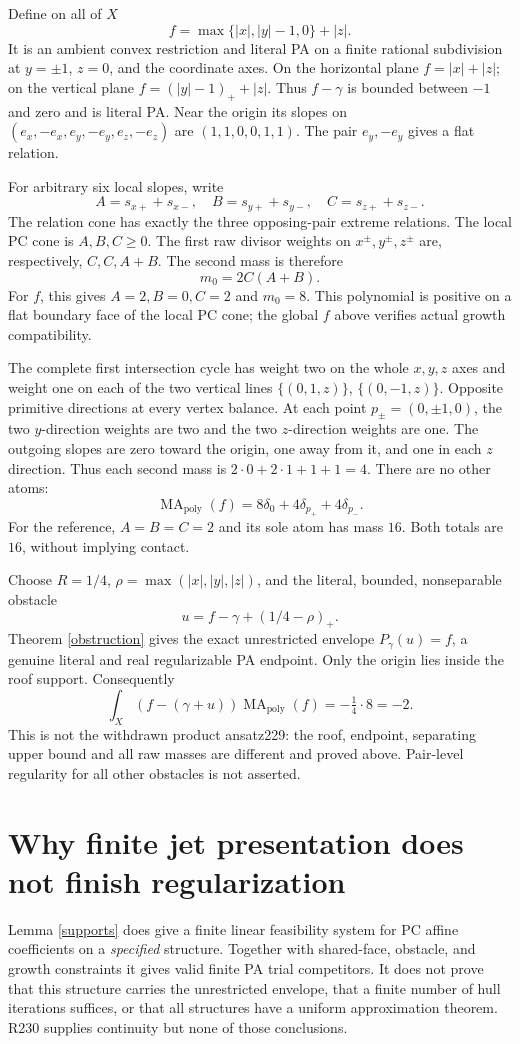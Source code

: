 \documentclass[11pt]{article}
\newcommand{\MA}{\operatorname{MA}_{\mathrm{poly}}}
\begin{document}
Define on all of \(X\)
\[
 f=\max\{|x|,|y|-1,0\}+|z|.
\]
It is an ambient convex restriction and literal PA on a finite
rational subdivision at \(y=\pm1\), \(z=0\), and the coordinate axes.
On the horizontal plane \(f=|x|+|z|\); on the vertical plane
\(f=(|y|-1)_++|z|\). Thus \(f-\gamma\) is bounded between \(-1\)
and zero and is literal PA. Near the origin its slopes on
\((e_x,-e_x,e_y,-e_y,e_z,-e_z)\) are
\((1,1,0,0,1,1)\). The pair \(e_y,-e_y\) gives a flat relation.

For arbitrary six local slopes, write
\[
 A=s_{x+}+s_{x-},\quad B=s_{y+}+s_{y-},\quad
 C=s_{z+}+s_{z-}.
\]
The relation cone has exactly the three opposing-pair extreme relations.
The local PC cone is \(A,B,C\geq0\). The first raw divisor weights
on \(x^\pm,y^\pm,z^\pm\) are, respectively, \(C,C,A+B\).
The second mass is therefore
\[
 m_0=2C(A+B).
\]
For \(f\), this gives \(A=2,B=0,C=2\) and \(m_0=8\).
This polynomial is positive on a flat boundary face of the local PC
cone; the global \(f\) above verifies actual growth compatibility.

The complete first intersection cycle has weight two on the whole
\(x,y,z\) axes and weight one on each of the two vertical lines
\(\{(0,1,z)\}\), \(\{(0,-1,z)\}\). Opposite primitive directions at
every vertex balance. At each point \(p_\pm=(0,\pm1,0)\), the two
\(y\)-direction weights are two and the two \(z\)-direction weights
are one. The outgoing slopes are zero toward the origin, one away
from it, and one in each \(z\) direction. Thus each second mass is
\(2\cdot0+2\cdot1+1+1=4\). There are no other atoms:
\[
 \MA(f)=8\delta_0+4\delta_{p_+}+4\delta_{p_-}.
\]
For the reference, \(A=B=C=2\) and its sole atom has mass \(16\).
Both totals are \(16\), without implying contact.

Choose \(R=1/4\), \(\rho=\max(|x|,|y|,|z|)\), and the literal,
bounded, nonseparable obstacle
\[
 u=f-\gamma+(1/4-\rho)_+.
\]
Theorem \ref{obstruction} gives the exact unrestricted envelope
\(P_\gamma(u)=f\), a genuine literal and real regularizable PA endpoint.
Only the origin lies inside the roof support. Consequently
\[
 \int_X(f-(\gamma+u))\MA(f)=-\tfrac14\cdot8=-2.
\]
This is not the withdrawn product ansatz229: the roof, endpoint,
separating upper bound and all raw masses are different and proved
above. Pair-level regularity for all other obstacles is not asserted.

\section{Why finite jet presentation does not finish regularization}
Lemma \ref{supports} does give a finite linear feasibility system for
PC affine coefficients on a \emph{specified} structure. Together with
shared-face, obstacle, and growth constraints it gives valid finite
PA trial competitors. It does not prove that this structure carries
the unrestricted envelope, that a finite number of hull iterations
suffices, or that all structures have a uniform approximation theorem.
R230 supplies continuity but none of those conclusions.
\end{document}
